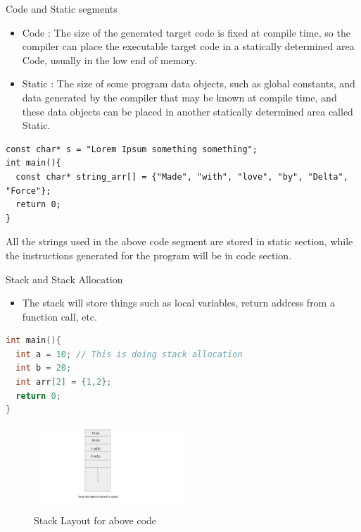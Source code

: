 \documentclass[
  10pt,
  ignorenonframetext,
]{beamer}
\providecommand{\tightlist}{%
  \setlength{\itemsep}{0pt}\setlength{\parskip}{0pt}}
\begin{document}
\begin{frame}[fragile]{Code and Static segments}
\protect\hypertarget{code-and-static-segments}{}
\begin{itemize}
\tightlist
\item
  Code : The size of the generated target code is
  fixed at compile time, so the compiler can place
  the executable target code in a statically
  determined area Code, usually in the low end of
  memory.
\end{itemize}

\pause

\begin{itemize}
\tightlist
\item
  Static : The size of some program data objects,
  such as global constants, and data generated by
  the compiler that may be known at compile time,
  and these data objects can be placed in another
  statically determined area called Static.
\end{itemize}

\pause

\begin{verbatim}
const char* s = "Lorem Ipsum something something";
int main(){
  const char* string_arr[] = {"Made", "with", "love", "by", "Delta", "Force"};
  return 0;
}
\end{verbatim}

All the strings used in the above code segment are
stored in static section, while the instructions
generated for the program will be in code section.
\end{frame}

\begin{frame}[fragile]{Stack and Stack Allocation}
\protect\hypertarget{stack-and-stack-allocation}{}
\begin{itemize}
\tightlist
\item
  The stack will store things such as local
  variables, return address from a function call,
  etc.
\end{itemize}

\begin{lstlisting}[language=C]
int main(){
  int a = 10; // This is doing stack allocation
  int b = 20;
  int arr[2] = {1,2};
  return 0;
}
\end{lstlisting}

\begin{figure}
\centering
\includegraphics[width=0.5\textwidth,height=\textheight]{stack_layout.png}
\caption{Stack Layout for above code}
\end{figure}
\end{frame}
\end{document}
